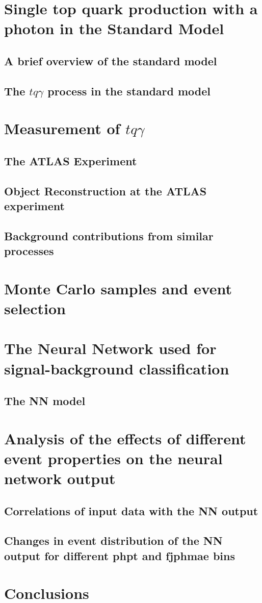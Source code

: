 \chapter{Single top quark production with a photon in the Standard Model}
\section{A brief overview of the standard model}
\section{The \texorpdfstring{$tq\gamma$}{TEXT} process in the standard model}
\chapter{Measurement of \texorpdfstring{$tq\gamma$}{TEXT}}
\section{The ATLAS Experiment}
\section{Object Reconstruction at the ATLAS experiment}
\section{Background contributions from similar processes}
\chapter{Monte Carlo samples and event selection}
\chapter{The Neural Network used for signal-background classification}
\section{The NN model}
\section{}
\chapter{Analysis of the effects of different event properties on the neural network output}
\section{Correlations of input data with the NN output}
\section{Changes in event distribution of the NN output for different phpt and fjphmae bins}
\chapter{Conclusions}
